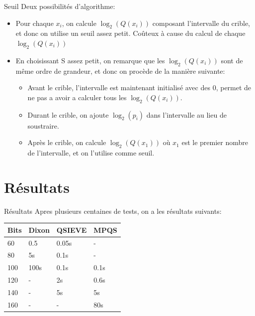 \documentclass{beamer}
\begin{document}
\begin{frame}{Seuil}
    Deux possibilités d'algorithme:
    \begin{itemize}
        \item Pour chaque $x_i$, on calcule $\log_2(Q(x_i))$ composant l'intervalle du crible, et donc on utilise un seuil assez petit. Coûteux à cause du calcul de chaque $\log_2(Q(x_i))$
        \item En choisissant S assez petit, on remarque que les $\log_2(Q(x_i))$ sont de même ordre de grandeur, et donc on procède de la manière suivante:
        \begin{itemize}
            \item Avant le crible, l'intervalle est maintenant initialisé avec des $0$, permet de ne pas a avoir a calculer tous les $\log_2(Q(x_i))$.
            \item Durant le crible, on ajoute $\log_2(p_i)$ dans l'intervalle au lieu de soustraire.
            \item Après le crible, on calcule $\log_2(Q(x_1))$ où $x_1$ est le premier nombre de l'intervalle, et on l'utilise comme seuil.
        \end{itemize}
    \end{itemize}
    
\end{frame}


\section{Résultats}

\begin{frame}{Résultats}
    Apres plusieurs centaines de tests, on a les résultats suivants:
    \newline
    \newline
    \begin{tabularx}{\textwidth}{|X||X|X|X|}
        \hline
        Bits & Dixon & QSIEVE & MPQS \\
        \hline \hline
        60 & 0.5 & 0.05s & - \\
        \hline
        80 & 5s & 0.1s & - \\
        \hline
        100 & 100s & 0.1s & 0.1s \\
        \hline
        120 & - & 2s & 0.6s \\
        \hline
        140 & - & 5s & 5s \\
        \hline
        160 & - & - & 80s \\
        \hline
    \end{tabularx}
\end{frame}
\end{document}
